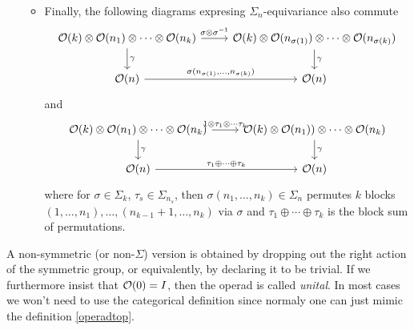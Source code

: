 \documentclass[TFM.tex]{subfiles}
\begin{document}
\begin{defi}
\begin{enumerate}
\begin{itemize}
\[\begin{tikzcd}
\end{tikzcd}
\]
\item Finally, the following diagrams expresing $\Sigma_n$-equivariance also commute
\[
\begin{tikzcd}
\OO(k)\otimes \OO(n_1)\otimes \cdots \otimes \OO(n_k)\arrow[d, "\gamma"] \arrow[r, "\sigma\otimes\sigma^{-1}"]& \OO(k)\otimes\OO(n_{\sigma(1)})\otimes\cdots\otimes \OO(n_{\sigma(k)})\arrow[d, "\gamma"]\\
\OO(n) \arrow[r, "{\sigma(n_{\sigma(1)},\dots,n_{\sigma(k)})}"]& \OO(n)
\end{tikzcd}
\]
and
\[
\begin{tikzcd}
\OO(k)\otimes \OO(n_1)\otimes \cdots \otimes \OO(n_k)\arrow[r, "1\otimes \tau_1\otimes\cdots\tau_k"]\arrow[d, "\gamma"] & \OO(k)\otimes\OO(n_1))\otimes\cdots\otimes \OO(n_k)\arrow[d,"\gamma"]\\
\OO(n)\arrow[r, "\tau_1\oplus\cdots\oplus\tau_k"] & \OO(n)
\end{tikzcd}
\]
where for $\sigma\in\Sigma_k$, $\tau_s\in\Sigma_{n_s}$, then $\sigma(n_1,\dots, n_k)\in\Sigma_n$ permutes $k$ blocks $(1,\dots, n_1),\dots, (n_{k-1}+1,\dots, n_k)$ via $\sigma$ and $\tau_1\oplus\cdots\oplus\tau_k$ is the block sum of permutations.
\end{itemize}

\end{enumerate}



\end{defi}

A non-symmetric (or non-$\Sigma$) version is obtained by dropping out the right action of the symmetric group, or equivalently, by declaring it to be trivial. If we furthermore insist that ${\mathcal O}(0)=I$, then the operad is called \emph{unital}. In most cases we won't need to use the categorical definition since normaly one can just mimic the definition \ref{operadtop}.
\end{document}
